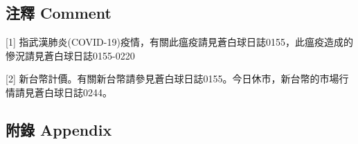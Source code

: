 \documentclass[a5paper, 12pt
]{book}
\begin{document}
\hypertarget{ux6ce8ux91cb-comment-91}{%
\subsection{注釋 Comment}\label{ux6ce8ux91cb-comment-91}}

{[}1{]}
指武漢肺炎(COVID-19)疫情，有關此瘟疫請見蒼白球日誌0155，此瘟疫造成的慘況請見蒼白球日誌0155-0220

{[}2{]}
新台幣計價。有關新台幣請參見蒼白球日誌0155。今日休市，新台幣的市場行情請見蒼白球日誌0244。

\hypertarget{ux9644ux9304-appendix-91}{%
\subsection{附錄 Appendix}\label{ux9644ux9304-appendix-91}}
\end{document}
